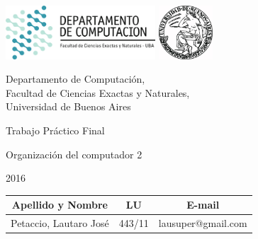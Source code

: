 \documentclass[a4paper, 10pt, twoside]{article}
\newcommand{\titulo}{Trabajo Práctico Final}
\newcommand{\materia}{Organización del computador 2}
\newcommand{\cuatrimestre}{2016}
\begin{document}
\thispagestyle{caratula}

\begin{center}

\includegraphics[height=2cm]{DC.png} 
\hfill
\includegraphics[height=2cm]{UBA.jpg} 

\vspace{2cm}

Departamento de Computación,\\
Facultad de Ciencias Exactas y Naturales,\\
Universidad de Buenos Aires

\vspace{4cm}

\begin{Huge}
\titulo
\end{Huge}

\vspace{0.5cm}

\begin{Large}
\materia
\end{Large}

\vspace{1cm}

\cuatrimestre

\vspace{4cm}

\begin{tabular}{|c|c|c|}
\hline
Apellido y Nombre & LU & E-mail\\
\hline
Petaccio, Lautaro José & 443/11 & lausuper@gmail.com\\
\hline
\end{tabular}

\end{center}

\newpage

\tableofcontents

\newpage


\end{document}
